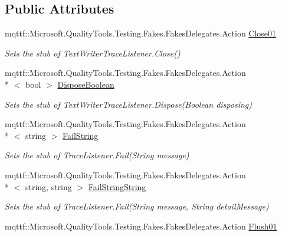 \subsection*{Public Attributes}
\begin{DoxyCompactItemize}
\item 
mqttf\-::\-Microsoft.\-Quality\-Tools.\-Testing.\-Fakes.\-Fakes\-Delegates.\-Action \hyperlink{class_system_1_1_diagnostics_1_1_fakes_1_1_stub_delimited_list_trace_listener_a4b89480b561722d86c9af09b8cc14aa9}{Close01}
\begin{DoxyCompactList}\small\item\em Sets the stub of Text\-Writer\-Trace\-Listener.\-Close()\end{DoxyCompactList}\item 
mqttf\-::\-Microsoft.\-Quality\-Tools.\-Testing.\-Fakes.\-Fakes\-Delegates.\-Action\\*
$<$ bool $>$ \hyperlink{class_system_1_1_diagnostics_1_1_fakes_1_1_stub_delimited_list_trace_listener_ac9a7a71a02c3bcf230041a4fa56b81df}{Dispose\-Boolean}
\begin{DoxyCompactList}\small\item\em Sets the stub of Text\-Writer\-Trace\-Listener.\-Dispose(\-Boolean disposing)\end{DoxyCompactList}\item 
mqttf\-::\-Microsoft.\-Quality\-Tools.\-Testing.\-Fakes.\-Fakes\-Delegates.\-Action\\*
$<$ string $>$ \hyperlink{class_system_1_1_diagnostics_1_1_fakes_1_1_stub_delimited_list_trace_listener_ae6f2dcfccf32c5f70c40b23b7ba64179}{Fail\-String}
\begin{DoxyCompactList}\small\item\em Sets the stub of Trace\-Listener.\-Fail(\-String message)\end{DoxyCompactList}\item 
mqttf\-::\-Microsoft.\-Quality\-Tools.\-Testing.\-Fakes.\-Fakes\-Delegates.\-Action\\*
$<$ string, string $>$ \hyperlink{class_system_1_1_diagnostics_1_1_fakes_1_1_stub_delimited_list_trace_listener_a308d522404b555ee9d0e7e6da22e2826}{Fail\-String\-String}
\begin{DoxyCompactList}\small\item\em Sets the stub of Trace\-Listener.\-Fail(\-String message, String detail\-Message)\end{DoxyCompactList}\item 
mqttf\-::\-Microsoft.\-Quality\-Tools.\-Testing.\-Fakes.\-Fakes\-Delegates.\-Action \hyperlink{class_system_1_1_diagnostics_1_1_fakes_1_1_stub_delimited_list_trace_listener_ab11a4889164707f23679a7788defab10}{Flush01}

\end{DoxyCompactItemize}
